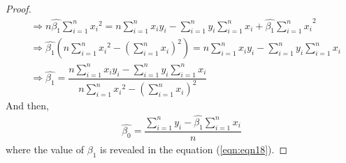 \begin{answer}
\begin{proof}
\begin{align}
        & \Rightarrow n\hat{\beta_1}\sum_{i = 1}^{n}{{x_i}^2} = n\sum_{i = 1}^{n}{x_iy_i} -\sum_{i = 1}^{n}{y_i}\sum_{i = 1}^{n}{x_i} + \hat{\beta_1}{\sum_{i = 1}^{n}{x_i}}^2\\
        & \Rightarrow \hat{\beta_1} \left(n\sum_{i = 1}^{n}{{x_i}^2} - {\left(\sum_{i = 1}^{n}{x_i}\right)}^2\right) = n\sum_{i = 1}^{n}{x_iy_i} -\sum_{i = 1}^{n}{y_i}\sum_{i = 1}^{n}{x_i}\\
        & \Rightarrow \hat{\beta_1} = \dfrac{n\sum_{i = 1}^{n}{x_iy_i} -\sum_{i = 1}^{n}{y_i}\sum_{i = 1}^{n}{x_i}}{n\sum_{i = 1}^{n}{{x_i}^2} - {\left(\sum_{i = 1}^{n}{x_i}\right)}^2}\label{eqn:eqn18}
    \end{align}
    And then, 
    \begin{align}
        \hat{\beta_0} = \dfrac{\sum_{i = 1}^{n}{y_i} - \hat{\beta_1}\sum_{i = 1}^{n}{x_i}}{n}
    \end{align}
    where the value of $\beta_1$ is revealed in the equation (\ref{eqn:eqn18}).
\end{proof}
\end{answer}